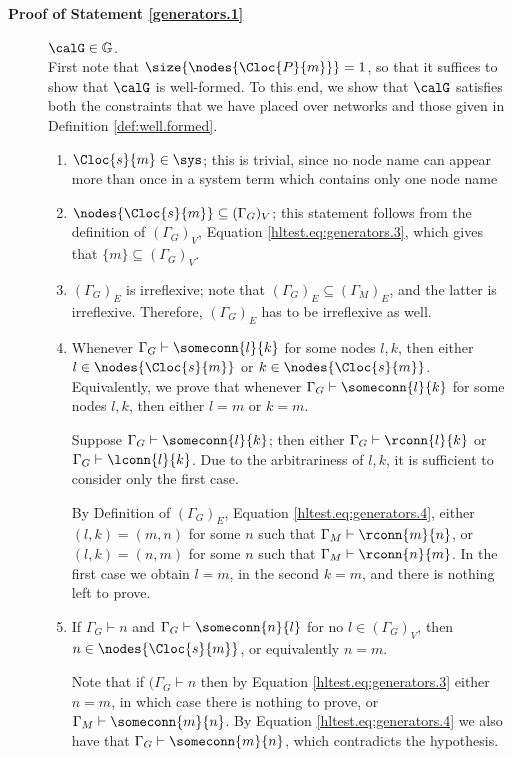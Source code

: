 \documentclass{LMCS}
\begin{document}
\begin{description}
\item[\textbf{Proof of Statement \ref{generators.1}}] $\calG \in \mathbb{G}$.\\
First note that $\size{\nodes{\Cloc{P}{m}}} = 1$, so that it suffices 
to show that $\calG$ is  well-formed.
To this end, we show that $\calG$ satisfies both the constraints that 
we have placed over networks and those given in Definition \ref{def:well.formed}. 
\begin{enumerate}
\item $\Cloc{s}{m} \in \sys$; this is trivial, since no node name can appear more 
than once in a system term which contains only one node name
\item $\nodes{\Cloc{s}{m}} \subseteq (\Gamma_G)_V$; this statement follows from the 
definition of $(\Gamma_G)_V$,  Equation \eqref{hltest.eq:generators.3}, which gives that $\{m\} \subseteq 
(\Gamma_G)_V$.
\item $(\Gamma_G)_E$ is irreflexive; note that $(\Gamma_G)_E \subseteq 
(\Gamma_M)_E$, and the latter is irreflexive. Therefore, $(\Gamma_G)_E$ has 
to be irreflexive as well.

\item Whenever $\Gamma_G \vdash \someconn{l}{k}$ for 
some nodes $l,k$, then either 
$l \in \nodes{\Cloc{s}{m}}$ or $k \in \nodes{\Cloc{s}{m}}$. 
Equivalently, we prove that whenever $\Gamma_G \vdash \someconn{l}{k}$ 
for some nodes $l,k$, then either $l=m$ or $k=m$.

Suppose $\Gamma_G \vdash \someconn{l}{k}$; then either 
$\Gamma_G \vdash \rconn{l}{k}$ or $\Gamma_G \vdash \lconn{l}{k}$. 
Due to the arbitrariness of $l,k$, it is sufficient to consider only the first case. 

By Definition of $(\Gamma_G)_E$, Equation \eqref{hltest.eq:generators.4}, 
either $(l,k) = (m,n)$ for some $n$ such that $\Gamma_M \vdash \rconn{m}{n}$, 
or $(l,k) = (n,m)$ for some $n$ such that $\Gamma_M \vdash \rconn{n}{m}$. 
In the first case we obtain $l = m$, in the second $k = m$, and there is nothing left to prove.

\item If $\Gamma_G \vdash n$ and $\Gamma_G \vdash \someconn{n}{l}$ for 
no $l \in (\Gamma_G)_V$, then $n \in \nodes{\Cloc{s}{m}}$, or 
equivalently $n = m$. 

Note that if $(\Gamma_G \vdash n$ then by Equation \eqref{hltest.eq:generators.3} either $n = m$, 
in which case there is nothing to prove, or  
$\Gamma_M \vdash \someconn{m}{n}$. By Equation \ref{hltest.eq:generators.4} we also 
have that $\Gamma_G \vdash \someconn{m}{n}$, which contradicts the hypothesis.
\end{enumerate}


\end{description}
\end{document}
